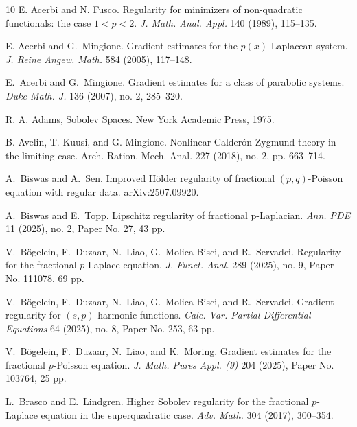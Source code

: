 \documentclass[10pt,letterpaper]{amsart}
\theoremstyle{definition}
\numberwithin{theorem}{section}
\numberwithin{equation}{section}
\newcommand{\1}{\ensuremath{\mathds{1}}}
\numberwithin{equation}{section}
\begin{document}
\begin{thebibliography}{10}
\newblock E. Acerbi and N. Fusco. 
\newblock Regularity for minimizers of non-quadratic functionals: the case $1<p<2$. 
\newblock \emph{J. Math. Anal. Appl.} 140 (1989), 115--135.

\newblock E. Acerbi and G.~Mingione.
\newblock Gradient estimates for the $p(x)$-Laplacean system.
\newblock \emph{J. Reine Angew. Math.} 584 (2005), 117--148.

\newblock E.~Acerbi and G.~Mingione.
\newblock Gradient estimates for a class of parabolic systems.
\newblock \emph{Duke Math. J.} 136 (2007), no. 2, 285--320.

R. A. Adams, Sobolev Spaces. New York Academic Press, 1975.

\newblock B. Avelin, T. Kuusi, and G. Mingione. 
\newblock Nonlinear Calder\'on-Zygmund
theory in the limiting case. 
\newblock Arch. Ration. Mech. Anal. 227 (2018), no. 2,
pp. 663--714.


%

\newblock A.~Biswas and A.~Sen. 
\newblock Improved Hölder regularity of fractional $(p,q)$-Poisson equation with regular data. 
\newblock arXiv:2507.09920.


\newblock A.~Biswas and E.~Topp. 
\newblock Lipschitz regularity of fractional p-Laplacian. 
\newblock \emph{Ann. PDE} 11 (2025), no. 2, Paper No. 27, 43 pp.

\newblock V.~Bögelein, F.~Duzaar, N.~Liao, G.~Molica Bisci, and R.~Servadei. 
\newblock Regularity for the fractional $p$-Laplace equation.
\newblock \emph{J. Funct. Anal.} 289 (2025), no. 9, Paper No. 111078, 69 pp.


\newblock V.~Bögelein, F.~Duzaar, N.~Liao, G.~Molica Bisci, and R.~Servadei. 
\newblock Gradient regularity for $(s,p)$-harmonic functions.
\newblock \emph{Calc. Var. Partial Differential Equations} 64 (2025), no. 8, Paper No. 253, 63 pp.

\newblock V.~Bögelein, F.~Duzaar, N.~Liao, and K.~Moring. 
\newblock Gradient estimates for the fractional $p$-Poisson equation. 
\newblock \emph{J. Math. Pures Appl. (9)} 204 (2025), Paper No. 103764, 25 pp.

\newblock L.~Brasco and E.~Lindgren. 
\newblock Higher Sobolev regularity for the fractional $p$-Laplace equation in the superquadratic case. 
\newblock \emph{Adv. Math.} 304 (2017), 300--354.


\end{thebibliography}
\end{document}
